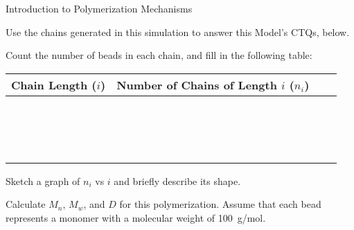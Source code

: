 \begin{activity}{Introduction to Polymerization Mechanisms}
\begin{model}
	Use the chains generated in this simulation to answer this Model's CTQs, below.

\end{model}
	
\begin{ctqs}

	\question Count the number of beads in each chain, and fill in the following table: \label{\labelbase:ctq:numbeadsstep}
		
		\begin{center}
		\renewcommand{\arraystretch}{2}
			\begin{tabular}{|c|c|c|c|}
				\hline
				\textbf{Chain Length ($i$)} & \textbf{Number of Chains of Length $i$  ($n_i$)} & \hspace{0.75in} & \hspace{0.75in} \\\hline
				&&&\\\hline
				&&&\\\hline
				&&&\\\hline
				&&&\\\hline
				&&&\\\hline
				&&&\\\hline
				&&&\\\hline
				&&&\\\hline
				&&&\\\hline
				&&&\\\hline
				&&&\\\hline
				&&&\\\hline
				&&&\\\hline
				&&&\\\hline
				&&&\\\hline
				&&&\\\hline
			\end{tabular}
		\end{center}
		
	\question Sketch a graph of $n_i$ vs $i$ and briefly describe its shape. \label{\labelbase:ctq:MWDstep}
	
		\begin{solution}[3in]
		\end{solution}
	
	\question Calculate $M_n$, $M_w$, and $D$ for this polymerization.  Assume that each bead represents a monomer with a molecular weight of 100~g/mol. \label{\labelbase:ctq:Dstep}
	
		\begin{solution}[3in]
		\end{solution}
	

\end{ctqs}
\end{activity}
